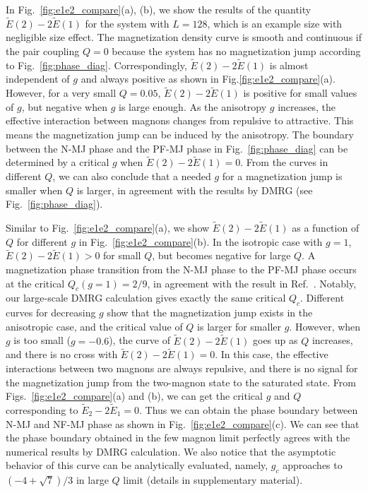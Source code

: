 \documentclass[article,10pt,onecolumn,superscriptaddress,floatfix]{revtex4}
\begin{document}
In Fig.~\ref{fig:e1e2_compare}(a), (b), we show the results of the quantity $\tilde{E}(2)-2\tilde{E}(1)$ for the system with $L=128$, which is an example size with negligible size effect.
The magnetization density curve is smooth and continuous if the pair coupling $Q=0$ because the system has no magnetization jump according to Fig.~\ref{fig:phase_diag}.  Correspondingly, $\tilde{E}(2)-2\tilde{E}(1)$ is almost independent of $g$ and always positive as shown in Fig.\ref{fig:e1e2_compare}(a). However, for a very small $Q=0.05$, $\tilde{E}(2)-2\tilde{E}(1)$ is positive for small values of $g$, but negative when $g$ is large enough. As the anisotropy $g$ increases, the effective interaction between magnons changes from repulsive to attractive. This means the magnetization jump can be induced by the anisotropy. The boundary between the N-MJ phase and the PF-MJ phase in Fig.~\ref{fig:phase_diag} can be determined by a critical $g$ when $\tilde{E}(2)-2\tilde{E}(1)=0$. From the curves in different $Q$, we can also conclude that a needed $g$ for a magnetization jump is smaller when $Q$ is larger, in agreement with the results by DMRG (see Fig.~\ref{fig:phase_diag}).

Similar to Fig.~\ref{fig:e1e2_compare}(a), we show $\tilde{E}(2)-2\tilde{E}(1)$ as a function of $Q$ for different $g$ in Fig.~\ref{fig:e1e2_compare}(b). In the isotropic case with $g=1$, $\tilde{E}(2)-2\tilde{E}(1)>0$ for small $Q$, but becomes negative for large $Q$. A magnetization phase transition from the N-MJ phase to the PF-MJ phase occurs at the critical $Q_c(g=1)=2/9$, in agreement with the result in Ref.~\cite{Adam2016}. Notably, our large-scale DMRG calculation gives exactly the same critical $Q_c$. Different curves for decreasing $g$ show that the magnetization jump exists in the anisotropic case, and the critical value of $Q$ is larger for smaller $g$. However, when $g$ is too small ($g=-0.6$), the curve of $\tilde{E}(2)-2\tilde{E}(1)$ goes up as $Q$ increases, and there is no cross with $\tilde{E}(2)-2\tilde{E}(1)=0$. In this case, the
effective interactions between two magnons are always repulsive, and there is no signal for the magnetization jump from the two-magnon state to the saturated state. 
From Figs.~\ref{fig:e1e2_compare}(a) and (b), we can get the critical $g$ and $Q$ corresponding to $\tilde{E}_{2}-2\tilde{E}_{1}=0$. Thus we can obtain the phase boundary between N-MJ and NF-MJ phase as shown in Fig.~\ref{fig:e1e2_compare}(c).
We can see that the phase boundary obtained in the few magnon limit perfectly agrees with the numerical results by DMRG calculation.
We also notice that the asymptotic behavior of this curve can be analytically evaluated, namely, $g_c$ approaches to $\left( -4+ \sqrt{7} \right)/3$ in large $Q$ limit (details in supplementary material).
\end{document}
